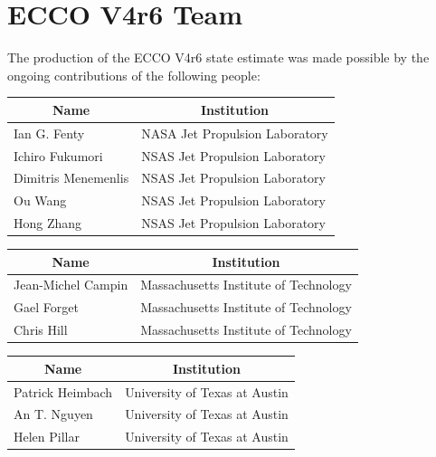 \pagebreak
\section{ECCO V4r6 Team}
The production of the ECCO V4r6 state estimate was made possible by the ongoing contributions of the following people:

\vspace{.5cm}

\vspace{.25cm}
\begin{center}
\begin{tabular}{ m{} m{}}
    \multicolumn{1}{c}{\textbf{Name}} & \multicolumn{1}{c}{\textbf{Institution}} \\ \hline
    Ian G. Fenty & NASA Jet Propulsion Laboratory\\ \hline
    Ichiro Fukumori & NSAS Jet Propulsion Laboratory \\ \hline
    Dimitris Menemenlis & NSAS Jet Propulsion Laboratory\\ \hline
    Ou Wang & NSAS Jet Propulsion Laboratory \\ \hline
    Hong Zhang & NSAS Jet Propulsion Laboratory\\ \hline
\end{tabular}
\end{center}

\vspace{.25cm}

\vspace{.25cm}
\begin{center}
\begin{tabular}{m{} m{} }
    \multicolumn{1}{c}{\textbf{Name}} & \multicolumn{1}{c}{\textbf{Institution}} \\ \hline
    Jean-Michel Campin & Massachusetts Institute of Technology \\ \hline
    Gael Forget & Massachusetts Institute of Technology \\ \hline
    Chris Hill & Massachusetts Institute of Technology \\ \hline
\end{tabular}
\end{center}

\vspace{.25cm}

\vspace{.25cm}
\begin{center}
\begin{tabular}{m{} m{} }
    \multicolumn{1}{c}{\textbf{Name}} & \multicolumn{1}{c}{\textbf{Institution}} \\ \hline
    Patrick Heimbach & University of Texas at Austin \\ \hline
    An T. Nguyen & University of Texas at Austin \\ \hline
    Helen Pillar & University of Texas at Austin \\ \hline
\end{tabular}
\end{center}

